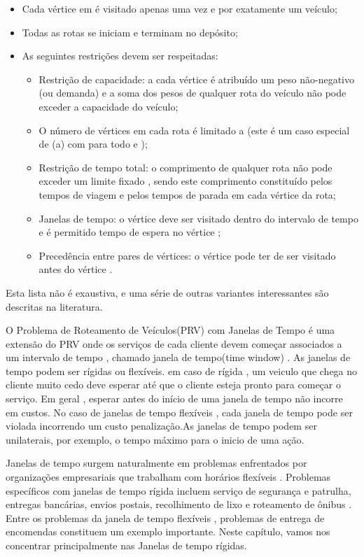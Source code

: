 \begin{itemize}
\item Cada vértice em é visitado apenas uma vez e por exatamente um veículo;
\item Todas as rotas se iniciam e terminam no depósito;
\item As seguintes restrições devem ser respeitadas:
\begin{itemize}
\item Restrição de capacidade: a cada vértice é atribuído um peso não-negativo (ou demanda) e a soma dos pesos de qualquer rota do veículo não pode exceder a capacidade do veículo;
\item O número de vértices em cada rota é limitado a (este é um caso especial de (a) com para todo e );
\item Restrição de tempo total: o comprimento de qualquer rota não pode exceder um limite fixado , sendo este comprimento constituído pelos tempos de viagem e pelos tempos de parada em cada vértice da rota; 
\item Janelas de tempo: o vértice deve ser visitado dentro do intervalo de tempo e é permitido tempo de espera no vértice ;
\item Precedência entre pares de vértices: o vértice pode ter de ser visitado antes do vértice .
\end{itemize}
\end{itemize}


Esta lista não é exaustiva, e uma série de outras variantes interessantes são descritas na literatura.


O Problema de Roteamento de Veículos(PRV) com Janelas de Tempo é uma extensão do PRV onde os serviços de cada cliente devem começar associados a um intervalo de tempo , chamado janela de tempo(time window) . As janelas de tempo podem ser rígidas ou flexíveis. em caso de rígida , um veiculo que chega no cliente muito cedo deve esperar até que o cliente esteja pronto para começar o serviço. Em geral , esperar antes do início de uma janela de tempo não incorre em custos. No caso de janelas de tempo flexíveis , cada janela de tempo pode ser violada incorrendo um custo penalização.As janelas de tempo podem ser unilaterais, por exemplo, o tempo máximo para o inicio de uma ação.


Janelas de tempo surgem naturalmente em problemas enfrentados por organizações empresariais que trabalham com horários flexíveis . Problemas específicos com janelas de tempo rígida incluem serviço de segurança e patrulha, entregas bancárias, envios postais, recolhimento de lixo e roteamento de ônibus . Entre os problemas da janela de tempo flexíveis , problemas de entrega de encomendas constituem um exemplo importante. Neste capítulo, vamos nos concentrar principalmente nas Janelas de tempo rígidas.



